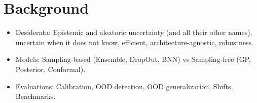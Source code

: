 \chapter{Background}
\label{chap:background}

\begin{itemize}
\item Desiderata: Epistemic and aleatoric uncertainty (and all their other names), uncertain when it does not know, efficient, architecture-agnostic, robustness.
\item Models: Sampling-based (Ensemble, DropOut, BNN) vs Sampling-free (GP, Posterior, Conformal). 
\item Evaluations: Calibration, OOD detection, OOD generalization, Shifts, Benchmarks.
\end{itemize}